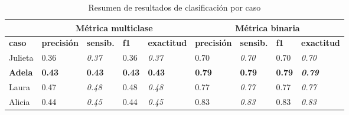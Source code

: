 \documentclass[
	spanish, %
	letterpaper, oneside
]{article}
\begin{document}
\begin{table}[htbp]
\centering
\caption{Resumen de resultados de clasificación por caso}
\begin{tabular}{l|llll|llll|}
\cline{2-9}
                                     & \multicolumn{4}{c|}{\textbf{Métrica multiclase}}                                                                                          & \multicolumn{4}{c|}{\textbf{Métrica binaria}}                                                                                                 \\ \hline
\multicolumn{1}{|l|}{\textbf{caso}}  & \multicolumn{1}{l|}{\textbf{precisión}} & \multicolumn{1}{l|}{\textbf{sensib.}} & \multicolumn{1}{l|}{\textbf{f1}}   & \textbf{exactitud} & \multicolumn{1}{l|}{\textbf{precisión}} & \multicolumn{1}{l|}{\textbf{sensib.}} & \multicolumn{1}{l|}{\textbf{f1}}   & \textbf{exactitud}     \\ \hline
\multicolumn{1}{|l|}{Julieta}        & \multicolumn{1}{l|}{0.36}               & \multicolumn{1}{l|}{\textit{0.37}}    & \multicolumn{1}{l|}{0.36}          & \textit{0.37}      & \multicolumn{1}{l|}{0.70}               & \multicolumn{1}{l|}{\textit{0.70}}    & \multicolumn{1}{l|}{0.70}          & \textit{0.70}          \\ \hline
\multicolumn{1}{|l|}{\textbf{Adela}} & \multicolumn{1}{l|}{\textbf{0.43}}      & \multicolumn{1}{l|}{\textbf{0.43}}    & \multicolumn{1}{l|}{\textbf{0.43}} & \textbf{0.43}      & \multicolumn{1}{l|}{\textbf{0.79}}      & \multicolumn{1}{l|}{\textbf{0.79}}    & \multicolumn{1}{l|}{\textbf{0.79}} & \textit{\textbf{0.79}} \\ \hline
\multicolumn{1}{|l|}{Laura}          & \multicolumn{1}{l|}{0.47}               & \multicolumn{1}{l|}{\textit{0.48}}    & \multicolumn{1}{l|}{0.48}          & \textit{0.48}      & \multicolumn{1}{l|}{0.77}               & \multicolumn{1}{l|}{\textit{0.77}}    & \multicolumn{1}{l|}{0.77}          & \textit{0.77}          \\ \hline
\multicolumn{1}{|l|}{Alicia}         & \multicolumn{1}{l|}{0.44}               & \multicolumn{1}{l|}{\textit{0.45}}    & \multicolumn{1}{l|}{0.44}          & \textit{0.45}      & \multicolumn{1}{l|}{0.83}               & \multicolumn{1}{l|}{\textit{0.83}}    & \multicolumn{1}{l|}{0.83}          & \textit{0.83}          \\ \hline
\end{tabular}
\label{tab:NB_results}
\end{table}
\end{document}
